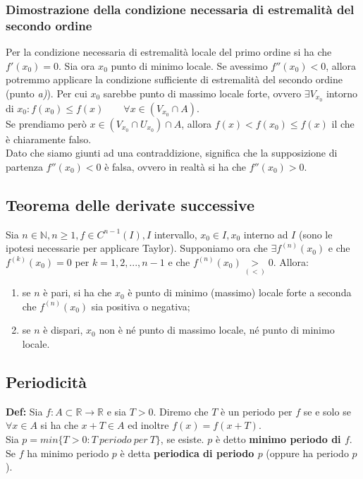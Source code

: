 \documentclass{article}
\begin{document}
\subsubsection{Dimostrazione della condizione necessaria di estremalità del secondo ordine}
Per la condizione necessaria di estremalità locale del primo ordine si ha che $f'(x_0) = 0$. Sia ora $x_0$ punto di minimo locale. Se avessimo $f''(x_0) < 0$, allora potremmo applicare la condizione sufficiente di estremalità del secondo ordine (punto \textit{a)}). Per cui $x_0$ sarebbe punto di massimo locale forte, ovvero $\exists V_{x_0}$ intorno di $x_0 : f(x_0) \leq f(x) \qquad \forall x \in (V_{x_0} \cap A)$.\\
Se prendiamo però $x \in (V_{x_0} \cap U_{x_0}) \cap A$, allora $f(x) < f(x_0) \leq f(x)$ il che è chiaramente falso. \\
Dato che siamo giunti ad una contraddizione, significa che la supposizione di partenza $f''(x_0) < 0$ è falsa, ovvero in realtà si ha che $f''(x_0) > 0$.

\subsection{Teorema delle derivate successive}
Sia $n \in \mathbb{N}, n \geq 1, f \in C^{n - 1}(I), I$ intervallo, $x_0 \in I, x_0$ interno ad $I$ (sono le ipotesi necessarie per applicare Taylor). Supponiamo ora che $\exists f^{(n)}(x_0)$ e che $f^{(k)}(x_0) = 0$ per $k = 1, 2, ..., n - 1$ e che $f^{(n)}(x_0) \underset{(<)}{>} 0$. Allora:
\begin{enumerate}
    \item se $n$ è pari, si ha che $x_0$ è punto di minimo (massimo) locale forte a seconda che $f^{(n)}(x_0)$ sia positiva o negativa;
    \item se $n$ è dispari, $x_0$ non è né punto di massimo locale, né punto di minimo locale.
\end{enumerate}

\subsection{Periodicità}
\textbf{Def:} Sia $f: A \subset \mathbb{R} \xrightarrow{} \mathbb{R}$ e sia $T > 0$. Diremo che $T$ è un periodo per $f$ se e solo se $\forall x \in A$ si ha che $x + T \in A$ ed inoltre $f(x) = f(x + T)$.\\
Sia $p = min\{T > 0 : T \ periodo \ per \ T\}$, se esiste. $p$ è detto \textbf{minimo periodo di $f$}. Se $f$ ha minimo periodo $p$ è detta \textbf{periodica di periodo $p$} (oppure ha periodo $p$).\\
\end{document}
